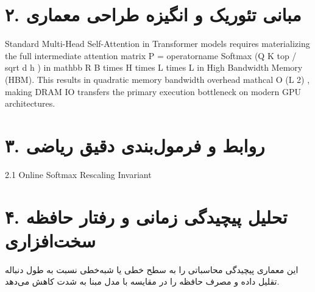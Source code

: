 \documentclass[12pt,a4paper]{article}
\begin{document}
\section*{۲. مبانی تئوریک و انگیزه طراحی معماری}
Standard Multi-Head Self-Attention in Transformer models requires materializing the full intermediate attention matrix P = operatorname Softmax (Q K top / sqrt d h ) in mathbb R B times H times L times L in High Bandwidth Memory (HBM). This results in quadratic memory bandwidth overhead mathcal O (L 2) , making DRAM IO transfers the primary execution bottleneck on modern GPU architectures.

\section*{۳. روابط و فرمول‌بندی دقیق ریاضی}
2.1 Online Softmax Rescaling Invariant

\section*{۴. تحلیل پیچیدگی زمانی و رفتار حافظه سخت‌افزاری}
این معماری پیچیدگی محاسباتی را به سطح خطی یا شبه‌خطی نسبت به طول دنباله تقلیل داده و مصرف حافظه را در مقایسه با مدل مبنا به شدت کاهش می‌دهد.
\end{document}
